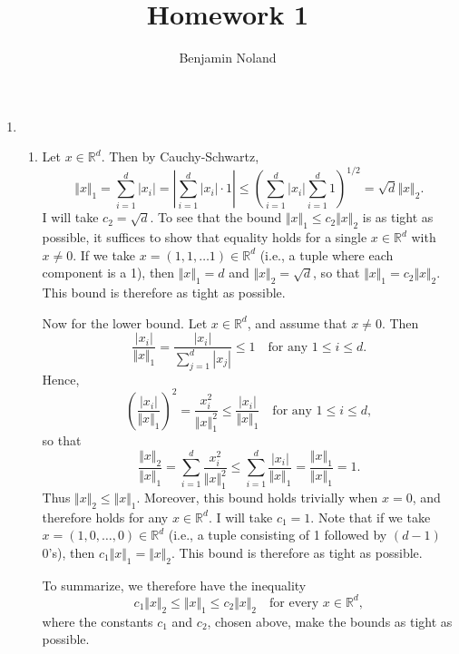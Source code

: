 \documentclass[12pt]{article}
\title{Homework 1}
\author{Benjamin Noland}
\date{}
\begin{document}
\maketitle

\begin{enumerate}
\item
\begin{enumerate}[label=(\roman*)]
\item
Let $x \in \mathbb{R}^d$. Then by Cauchy-Schwartz,
\begin{equation*}
\Vert x \Vert_1 = \sum_{i=1}^d |x_i| = \left| \sum_{i=1}^d |x_i| \cdot 1 \right| \leq \left(\sum_{i=1}^d |x_i| \sum_{i=1}^d 1 \right)^{1/2} = \sqrt{d} \Vert x \Vert_2.
\end{equation*}
I will take $c_2 = \sqrt{d}$. To see that the bound $\Vert x \Vert_1 \leq c_2 \Vert x \Vert_2$ is as tight as possible, it suffices to show that equality holds for a single $x \in \mathbb{R}^d$ with $x \neq 0$. If we take $x = (1, 1, \ldots 1) \in \mathbb{R}^d$ (i.e., a tuple where each component is a 1), then $\Vert x \Vert_1 = d$ and $\Vert x \Vert_2 = \sqrt{d}$, so that $\Vert x \Vert_1 = c_2 \Vert x \Vert_2$. This bound is therefore as tight as possible.

Now for the lower bound. Let $x \in \mathbb{R}^d$, and assume that $x \neq 0$. Then
\begin{equation*}
\frac{|x_i|}{\Vert x \Vert_1} = \frac{|x_i|}{\sum_{j=1}^d |x_j|} \leq 1 \quad \text{for any $1 \leq i \leq d$}.
\end{equation*}
Hence,
\begin{equation*}
\left(\frac{|x_i|}{\Vert x \Vert_1}\right)^2 = \frac{x_i^2}{\Vert x \Vert_1^2} \leq \frac{|x_i|}{\Vert x \Vert_1} \quad \text{for any $1 \leq i \leq d$},
\end{equation*}
so that
\begin{equation*}
\frac{\Vert x \Vert_2}{\Vert x \Vert_1} = \sum_{i=1}^d \frac{x_i^2}{\Vert x \Vert_1^2} \leq \sum_{i=1}^d \frac{|x_i|}{\Vert x \Vert_1} = \frac{\Vert x \Vert_1}{\Vert x \Vert_1} = 1.
\end{equation*}
Thus $\Vert x \Vert_2 \leq \Vert x \Vert_1$. Moreover, this bound holds trivially when $x = 0$, and therefore holds for any $x \in \mathbb{R}^d$. I will take $c_1 = 1$. Note that if we take $x = (1, 0, \ldots, 0) \in \mathbb{R}^d$ (i.e., a tuple consisting of 1 followed by $(d-1)$ 0's), then $c_1 \Vert x \Vert_1 = \Vert x \Vert_2$. This bound is therefore as tight as possible.

To summarize, we therefore have the inequality
\begin{equation*}
c_1 \Vert x \Vert_2 \leq \Vert x \Vert_1 \leq c_2 \Vert x \Vert_2 \quad \text{for every $x \in \mathbb{R}^d$},
\end{equation*}
where the constants $c_1$ and $c_2$, chosen above, make the bounds as tight as possible.


\end{enumerate}
\end{enumerate}
\end{document}
